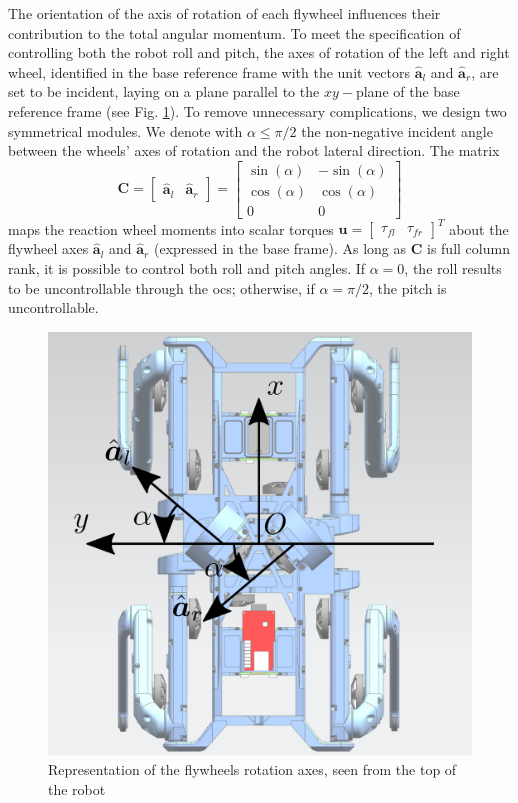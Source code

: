 \documentclass[letterpaper, 10 pt, conference]{ieeeconf}  %
\begin{document}
The orientation of the axis of rotation of each flywheel influences their contribution to the total angular momentum. To meet the specification of controlling both the robot roll and pitch, the axes of rotation of the left and right wheel, identified in the base reference frame with the unit vectors $\hat{\bm{a}}_l$ and $\hat{\bm{a}}_r$, are set to be incident, laying on a plane parallel to the $xy-$plane of the base reference frame (see Fig. \ref{fig:axes}). 
To remove unnecessary complications, we design two symmetrical modules. We denote with $\alpha \leq \pi/2$ the non-negative incident angle between the wheels' axes of rotation and the robot lateral direction. The matrix 
\begin{equation}
\bm{C} = 
\left[ \begin{array}{cc}
\hat{\bm{a}}_l & \hat{\bm{a}}_r
\end{array} \right] = 
\left[ \begin{array}{cc}
\sin(\alpha) & -\sin(\alpha) \\
\cos(\alpha) & \cos(\alpha) \\
0 & 0
\end{array} \right]
\end{equation}
maps the reaction wheel moments into scalar torques $\bm{u} = \left[\begin{array}{cc} \tau_{fl} & \tau_{fr} \end{array} \right]^T$ about the flywheel axes $\hat{\bm{a}}_l$ and $\hat{\bm{a}}_r$ (expressed in the base frame).
As long as $\bm{C}$ is full column rank, it is possible to control both roll and pitch angles. If $\alpha = 0$, the roll results to be uncontrollable through the \gls{ocs}; otherwise, if $\alpha = \pi/2$, the pitch is uncontrollable. 
\begin{figure}
	\centering
	\includegraphics[width=0.7\linewidth]{figures/axes.eps}
	\caption{\small Representation of the flywheels rotation axes, seen from the top of the robot}
	\label{fig:axes}
\end{figure}
\end{document}
